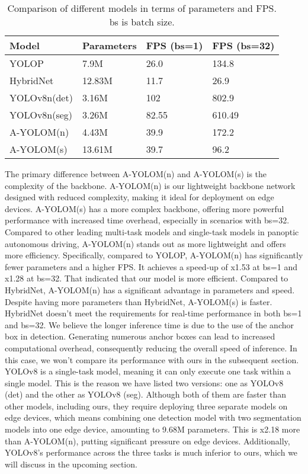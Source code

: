 \documentclass[lettersize,journal]{IEEEtran}
\begin{document}
\begin{table}[h]
\centering
\caption{Comparison of different models in terms of parameters and FPS. bs is batch size.}
\label{tab:inference}
\begin{tabularx}{\linewidth}{YYYY}
\toprule
Model & Parameters & FPS (bs=1) & FPS (bs=32) \\
\midrule
YOLOP & 7.9M & 26.0 & 134.8 \\
HybridNet & 12.83M & 11.7 & 26.9 \\
YOLOv8n(det) & 3.16M & 102 & 802.9 \\
YOLOv8n(seg) & 3.26M & 82.55 & 610.49 \\
A-YOLOM(n) & 4.43M & 39.9 & 172.2 \\
A-YOLOM(s) & 13.61M & 39.7 & 96.2 \\
\bottomrule
\end{tabularx}
\end{table}

The primary difference between A-YOLOM(n) and A-YOLOM(s) is the complexity of the backbone. A-YOLOM(n) is our lightweight backbone network designed with reduced complexity, making it ideal for deployment on edge devices. A-YOLOM(s) has a more complex backbone, offering more powerful performance with increased time overhead, especially in scenarios with bs=32. Compared to other leading multi-task models and single-task models in panoptic autonomous driving, A-YOLOM(n) stands out as more lightweight and offers more efficiency. Specifically, compared to YOLOP, A-YOLOM(n) has significantly fewer parameters and a higher FPS. It achieves a speed-up of x1.53 at bs=1 and x1.28 at bs=32. That indicated that our model is more efficient. Compared to HybridNet, A-YOLOM(n) has a significant advantage in parameters and speed. Despite having more parameters than HybridNet, A-YOLOM(s) is faster. HybridNet doesn't meet the requirements for real-time performance in both bs=1 and bs=32. We believe the longer inference time is due to the use of the anchor box in detection. Generating numerous anchor boxes can lead to increased computational overhead, consequently reducing the overall speed of inference. In this case, we won't compare its performance with ours in the subsequent section. YOLOv8 is a single-task model, meaning it can only execute one task within a single model. This is the reason we have listed two versions: one as YOLOv8 (det) and the other as YOLOv8 (seg). Although both of them are faster than other models, including ours, they require deploying three separate models on edge devices, which means combining one detection model with two segmentation models into one edge device, amounting to 9.68M parameters. This is x2.18 more than A-YOLOM(n), putting significant pressure on edge devices. Additionally, YOLOv8's performance across the three tasks is much inferior to ours, which we will discuss in the upcoming section.
\end{document}
